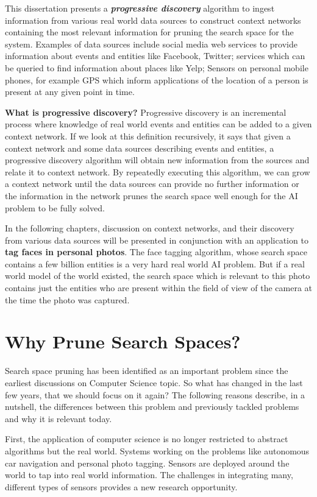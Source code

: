 This dissertation presents a \textbf{\textit{progressive discovery}} algorithm to ingest information from various real world data sources to construct context networks containing the most relevant information for pruning the search space for the system. Examples of data sources include social media web services to provide information about events and entities like Facebook, Twitter; services which can be queried to find information about places like Yelp; Sensors on personal mobile phones, for example GPS which inform applications of the location of a person is present at any given point in time.

\textbf{What is progressive discovery?} Progressive discovery is an incremental process  where knowledge of real world events and entities can be added to a given context network. If we look at this definition recursively, it says that given a context network and some data sources describing events and entities, a progressive discovery algorithm will obtain new information from the sources and relate it to context network. By repeatedly executing this algorithm, we can grow a context network until the data sources can provide no further information or the information in the network prunes the search space well enough for the AI problem to be fully solved.

In the following chapters, discussion on context networks, and their discovery from various data sources will be presented in conjunction with an application to \textbf{tag faces in personal photos}. The face tagging algorithm, whose search space contains a few billion entities is a very hard real world AI problem. But if a real world model of the world existed, the search space which is relevant to this photo contains just the entities who are present within the field of view of the camera at the time the photo was captured. 

\section{Why Prune Search Spaces?}
Search space pruning has been identified as an important problem since the earliest discussions on Computer Science topic. So what has changed in the last few years, that we should focus on it again? The following reasons describe, in a nutshell, the differences between this problem and previously tackled problems and why it is relevant today.

First, the application of computer science is no longer restricted to abstract algorithms but the real world. Systems working on the problems like autonomous car navigation and personal photo tagging. Sensors are deployed around the world to tap into real world information. The challenges in integrating many, different types of sensors provides a new research opportunity.

